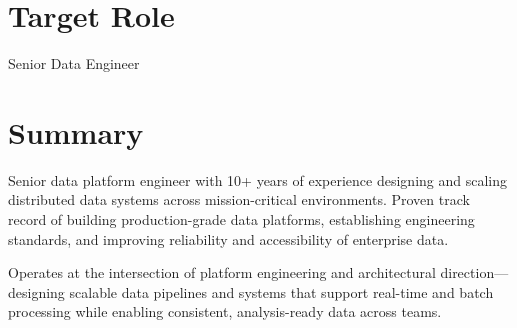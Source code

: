 \section*{Target Role}
\begin{center}
	\vspace{-0.4em}
	Senior Data Engineer
\end{center}
\vspace{-1em}


\section*{Summary}
\vspace{-0.3em}

Senior data platform engineer with 10+ years of experience designing and scaling distributed data systems across mission-critical environments. Proven track record of building production-grade data platforms, establishing engineering standards, and improving reliability and accessibility of enterprise data.

Operates at the intersection of platform engineering and architectural direction—designing scalable data pipelines and systems that support real-time and batch processing while enabling consistent, analysis-ready data across teams.

